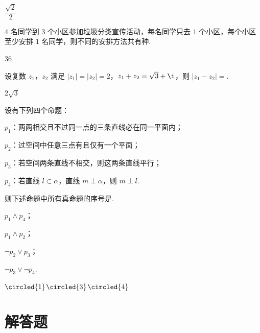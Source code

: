 \begin{answer}
\(\dfrac{\sqrt2}{2}\)
\end{answer}

\begin{problem}
\(4\) 名同学到 \(3\) 个小区参加垃圾分类宣传活动，每名同学只去 \(1\) 个小区，每个小区至少安排 \(1\) 名同学，则不同的安排方法共有\fillinblank{}种.
\end{problem}

\begin{answer}
36
\end{answer}

\begin{problem}
设复数 \(z_1\)，\(z_2\) 满足 \(|z_1|=|z_2|=2\)，\(z_1+z_2=\sqrt3+\i\)，则 \(|z_1-z_2|=\)\fillinblank{}.
\end{problem}

\begin{answer}
\(2\sqrt3\)
\end{answer}

\begin{problem}
设有下列四个命题：

\begin{circlelist}
\item \(p_1\)：两两相交且不过同一点的三条直线必在同一平面内；
\item \(p_2\)：过空间中任意三点有且仅有一个平面；
\item \(p_3\)：若空间两条直线不相交，则这两条直线平行；
\item \(p_4\)：若直线 \(l\subset \alpha\)，直线 \(m\perp \alpha\)，则 \(m\perp l\).
\end{circlelist}

则下述命题中所有真命题的序号是\fillinblank{}.

\begin{circlelist}
\item \(p_1\land p_4\)；
\item \(p_1\land p_2\)；
\item \(\neg p_2\vee p_3\)；
\item \(\neg p_3\vee \neg p_4\).
\end{circlelist}
\end{problem}

\begin{answer}
\(\circled{1}\)\(\circled{3}\)\(\circled{4}\)
\end{answer}

\section{解答题}

